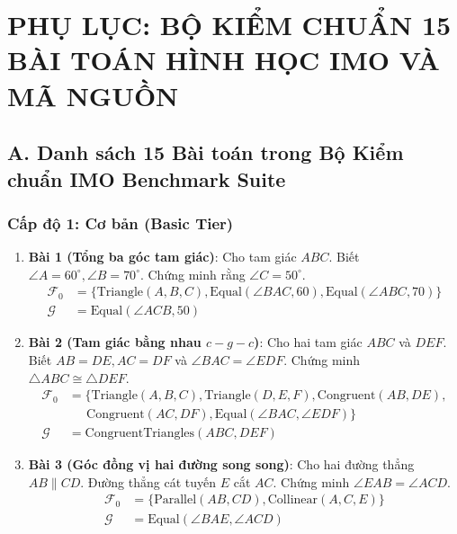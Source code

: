 
\chapter*{PHỤ LỤC: BỘ KIỂM CHUẨN 15 BÀI TOÁN HÌNH HỌC IMO VÀ MÃ NGUỒN}
\label{chap:appendix}

\section*{A. Danh sách 15 Bài toán trong Bộ Kiểm chuẩn IMO Benchmark Suite}

\subsection*{Cấp độ 1: Cơ bản (Basic Tier)}
\begin{enumerate}
    \item \textbf{Bài 1 (Tổng ba góc tam giác)}: Cho tam giác $ABC$. Biết $\angle A = 60^\circ, \angle B = 70^\circ$. Chứng minh rằng $\angle C = 50^\circ$.
    \begin{align*}
        \mathcal{F}_0 &= \{\text{Triangle}(A,B,C), \text{Equal}(\angle BAC, 60), \text{Equal}(\angle ABC, 70)\} \\
        \mathcal{G} &= \text{Equal}(\angle ACB, 50)
    \end{align*}
    
    \item \textbf{Bài 2 (Tam giác bằng nhau $c-g-c$)}: Cho hai tam giác $ABC$ và $DEF$. Biết $AB = DE, AC = DF$ và $\angle BAC = \angle EDF$. Chứng minh $\triangle ABC \cong \triangle DEF$.
    \begin{align*}
        \mathcal{F}_0 &= \{\text{Triangle}(A,B,C), \text{Triangle}(D,E,F), \text{Congruent}(AB,DE), \\
        &\quad\ \ \text{Congruent}(AC,DF), \text{Equal}(\angle BAC, \angle EDF)\} \\
        \mathcal{G} &= \text{CongruentTriangles}(ABC, DEF)
    \end{align*}

    \item \textbf{Bài 3 (Góc đồng vị hai đường song song)}: Cho hai đường thẳng $AB \parallel CD$. Đường thẳng cát tuyến $E$ cắt $AC$. Chứng minh $\angle EAB = \angle ACD$.
    \begin{align*}
        \mathcal{F}_0 &= \{\text{Parallel}(AB, CD), \text{Collinear}(A, C, E)\} \\
        \mathcal{G} &= \text{Equal}(\angle BAE, \angle ACD)
    \end{align*}
\end{enumerate}

